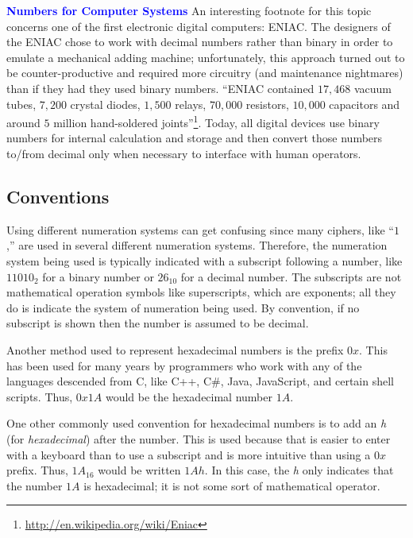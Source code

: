 \medskip %
\begin{tcolorbox}[colback=blue!5!white,colframe=blue!75!black]
  \textcolor{blue}{\textbf{Numbers for Computer Systems}}
  \tcblower
  An interesting footnote for this topic concerns one of the first electronic digital computers: ENIAC. The designers of the ENIAC chose to work with decimal numbers rather than binary in order to emulate a mechanical adding machine; unfortunately, this approach turned out to be counter-productive and required more circuitry (and maintenance nightmares) than if they had they used binary numbers. ``ENIAC contained $ 17,468 $ vacuum tubes, $ 7,200 $ crystal diodes, $ 1,500 $ relays, $ 70,000 $ resistors, $ 10,000 $ capacitors and around $ 5 $ million hand-soldered joints''\footnote{\url{http://en.wikipedia.org/wiki/Eniac}}. Today, all digital devices use binary numbers for internal calculation and storage and then convert those numbers to/from decimal only when necessary to interface with human operators.
\end{tcolorbox}

\subsection{Conventions}
\label{MF:sub:conventions}
Using different numeration systems can get confusing since many ciphers, like ``$ 1 $,'' are used in several different numeration systems. Therefore, the numeration system being used is typically indicated with a subscript following a number, like $ 11010_{2} $ for a binary number or $ 26_{10} $ for a decimal number. The subscripts are not mathematical operation symbols like superscripts, which are exponents; all they do is indicate the system of numeration being used. By convention, if no subscript is shown then the number is assumed to be decimal.

Another method used to represent hexadecimal numbers is the prefix $ 0x $. This has been used for many years by programmers who work with any of the languages descended from C, like C++, C\#, Java, JavaScript, and certain shell scripts. Thus, $ 0x1A $ would be the hexadecimal number $ 1A $.

One other commonly used convention for hexadecimal numbers is to add an \emph{h} (for \emph{hexadecimal}) after the number. This is used because that is easier to enter with a keyboard than to use a subscript and is more intuitive than using a $ 0x $ prefix. Thus, $ 1A_{16} $ would be written $ 1Ah $. In this case, the \emph{h} only indicates that the number $ 1A $ is hexadecimal; it is not some sort of mathematical operator.

